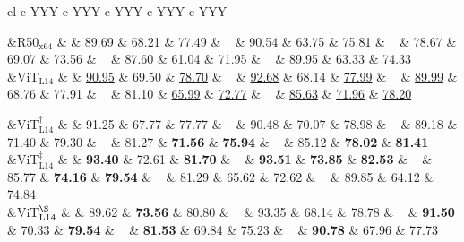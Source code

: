 \begin{table}[bp]
\begin{tabularx}{\textwidth}{cl c YYY c YYY c YYY c YYY c YYY}
\parbox[t]{1mm}{}
&{R50$_{\text{x64}}$} &  & 
89.69 & 68.21 & 77.49  & ~ &
90.54 & 63.75 & 75.81  & ~ &
78.67 & 69.07 & 73.56  & ~ &
\underline{87.60} & 61.04 & 71.95  & ~ &
89.95 & 63.33 & 74.33  \\



&{ViT$_{\text{L14}}$} &  & 
\underline{90.95} & 69.50 & \underline{78.70}  & ~ &
\underline{92.68} & 68.14 & \underline{77.99}  & ~ &
\underline{89.99} & 68.76 & 77.91  & ~ &
81.10 & \underline{65.99} & \underline{72.77}  & ~ &
\underline{85.63} & \underline{71.96} & \underline{78.20}  \\

 

&{ViT$_{\text{L14}}^\dag$} &  & 
91.25 & 67.77 & 77.77  & ~ &
90.48 & 70.07 & 78.98  & ~ &
89.18 & 71.40 & 79.30  & ~ &
81.27 & \textbf{71.56} & \textbf{75.94}  & ~ &
85.12 & \textbf{78.02} & \textbf{81.41}  \\

&{ViT$_{\text{L14}}^\ddag$} &  & 
\textbf{93.40} & 72.61 & \textbf{81.70}  & ~ &
\textbf{93.51} & \textbf{73.85} & \textbf{82.53}  & ~ &
85.77 & \textbf{74.16} & \textbf{79.54}  & ~ &
81.29 & 65.62 & 72.62  & ~ &
89.85 & 64.12 & 74.84  \\

&{ViT$_{\text{L14}}^\S$} &  & 
89.62 & \textbf{73.56} & 80.80  & ~ &
93.35 & 68.14 & 78.78  & ~ &
\textbf{91.50} & 70.33 & \textbf{79.54}  & ~ &
\textbf{81.53} & 69.84 & 75.23  & ~ &
\textbf{90.78} & 67.96 & 77.73  \\


\end{tabularx}
\end{table}
